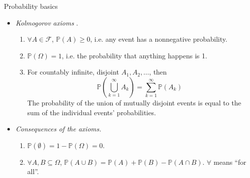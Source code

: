 \documentclass{beamer}
\numberwithin{equation}{section}
\begin{document}
\begin{frame}{Probability basics}
    \begin{itemize}
        \item
        \textit{Kolmogorov axioms} \cite{wasserman_stats}.
        \begin{enumerate}
            \item
            $ \forall A \in \mathcal{F} $, $ \mathbb{P}(A) \ge 0 $, i.e. any
            event has a nonnegative probability.

            \item
            $ \mathbb{P}(\Omega) = 1 $, i.e. the probability that anything
            happens is 1.

            \item
            For countably infinite, disjoint $ A_1, A_2, \ldots $, then
            \begin{equation*}
                \mathbb{P}\left(\bigcup_{k = 1}^\infty A_k\right) =
                \sum_{k = 1}^\infty\mathbb{P}(A_k)
            \end{equation*}
            The probability of the union of mutually disjoint events is equal
            to the sum of the individual events' probabilities.
        \end{enumerate}

        \item
        \textit{Consequences of the axioms.}
        \begin{enumerate}
            \item
            $ \mathbb{P}(\emptyset) = 1 - \mathbb{P}(\Omega) = 0 $.

            \item
            $ \forall A, B \subseteq \Omega $, $ \mathbb{P}(A \cup B) =
            \mathbb{P}(A) + \mathbb{P}(B) - \mathbb{P}(A \cap B) $. $ \forall $
            means ``for all''.
        \end{enumerate}
    \end{itemize}
\end{frame}
\end{document}
